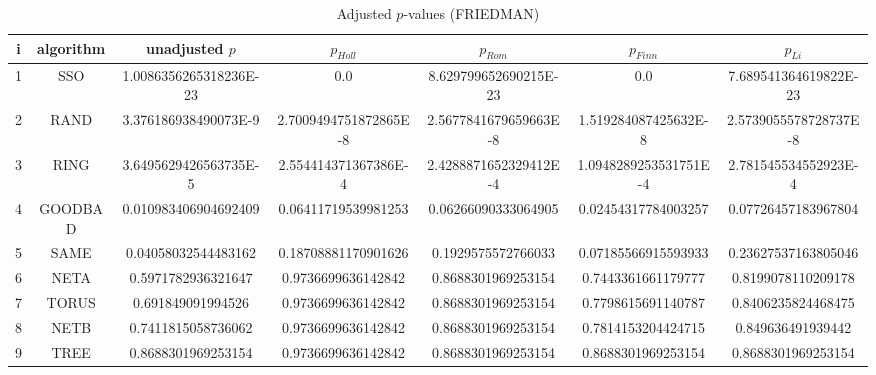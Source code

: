 \documentclass[a4paper,10pt]{article}
\begin{document}
\begin{landscape}
\begin{table}[!htp]
\centering\scriptsize
\caption{Adjusted $p$-values (FRIEDMAN)}
\begin{tabular}{ccccccc}
i&algorithm&unadjusted $p$&$p_{Holl}$&$p_{Rom}$&$p_{Finn}$&$p_{Li}$\\
\hline
1& SSO&1.0086356265318236E-23&0.0&8.629799652690215E-23&0.0&7.689541364619822E-23\\
2& RAND&3.376186938490073E-9&2.7009494751872865E-8&2.5677841679659663E-8&1.519284087425632E-8&2.5739055578728737E-8\\
3& RING&3.6495629426563735E-5&2.554414371367386E-4&2.4288871652329412E-4&1.0948289253531751E-4&2.781545534552923E-4\\
4& GOODBAD&0.010983406904692409&0.06411719539981253&0.06266090333064905&0.02454317784003257&0.07726457183967804\\
5& SAME&0.04058032544483162&0.18708881170901626&0.1929575572766033&0.07185566915593933&0.23627537163805046\\
6& NETA&0.5971782936321647&0.9736699636142842&0.8688301969253154&0.7443361661179777&0.8199078110209178\\
7& TORUS&0.691849091994526&0.9736699636142842&0.8688301969253154&0.7798615691140787&0.8406235824468475\\
8& NETB&0.7411815058736062&0.9736699636142842&0.8688301969253154&0.7814153204424715&0.849636491939442\\
9& TREE&0.8688301969253154&0.9736699636142842&0.8688301969253154&0.8688301969253154&0.8688301969253154\\
\hline
\end{tabular}
\end{table}


\newpage


\end{landscape}
\end{document}
